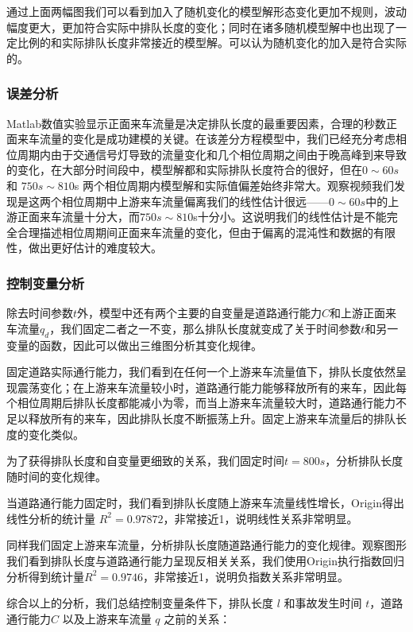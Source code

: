 \documentclass{cumcmart}
\begin{document}
通过上面两幅图我们可以看到加入了随机变化的模型解形态变化更加不规则，波动幅度更大，更加符合实际中排队长度的变化；同时在诸多随机模型解中也出现了一定比例的和实际排队长度非常接近的模型解。可以认为随机变化的加入是符合实际的。

\subsubsection{误差分析}
 
Matlab数值实验显示正面来车流量是决定排队长度的最重要因素，合理的秒数正面来车流量的变化是成功建模的关键。在该差分方程模型中，我们已经充分考虑相位周期内由于交通信号灯导致的流量变化和几个相位周期之间由于晚高峰到来导致的变化，在大部分时间段中，模型解都和实际排队长度符合的很好，但在$ {0\sim
60s}$ 和 $ {750s\sim 810}$s
两个相位周期内模型解和实际值偏差始终非常大。观察视频我们发现是这两个相位周期中上游来车流量偏离我们的线性估计很远------$ {0\sim
60s}$中的上游正面来车流量十分大，而$ {750s\sim
810}$s十分小。这说明我们的线性估计是不能完全合理描述相位周期间正面来车流量的变化，但由于偏离的混沌性和数据的有限性，做出更好估计的难度较大。

\subsubsection{控制变量分析}
 

除去时间参数$ {t}$外，模型中还有两个主要的自变量是道路通行能力$ {C}$和上游正面来车流量$q_{d}$，我们固定二者之一不变，那么排队长度就变成了关于时间参数$ {t}$和另一变量的函数，因此可以做出三维图分析其变化规律。

固定道路实际通行能力，我们看到在任何一个上游来车流量值下，排队长度依然呈现震荡变化；在上游来车流量较小时，道路通行能力能够释放所有的来车，因此每个相位周期后排队长度都能减小为零，而当上游来车流量较大时，道路通行能力不足以释放所有的来车，因此排队长度不断振荡上升。固定上游来车流量后的排队长度的变化类似。

为了获得排队长度和自变量更细致的关系，我们固定时间$ {t=800s}$，分析排队长度随时间的变化规律。

当道路通行能力固定时，我们看到排队长度随上游来车流量线性增长，Origin得出线性分析的统计量
$ {R}^{ {2}} {=0.97872}$，非常接近1，说明线性关系非常明显。

同样我们固定上游来车流量，分析排队长度随道路通行能力的变化规律。观察图形我们看到排队长度与道路通行能力呈现反相关关系，我们使用Origin执行指数回归分析得到统计量$R^{2}=0.9746$，非常接近1，说明负指数关系非常明显。

综合以上的分析，我们总结控制变量条件下，排队长度 $l$ 和事故发生时间
$ {t}$，道路通行能力$ { C}$ 以及上游来车流量 $ {q}$
之前的关系：
\end{document}
